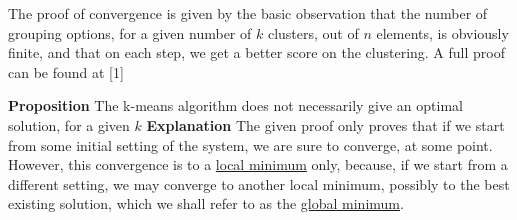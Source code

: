 \documentclass[12pt]{article}
\begin{document}
The proof of convergence is given by the basic observation that the number of grouping options, for a given number of $k$ clusters, out of \(n \) elements, is obviously finite, and that on each step, we get a better score on the clustering.
A full proof can be found at [1] \newline

\textbf{Proposition} The k-means algorithm does not necessarily give an optimal solution, for a given $k$\newline
\textbf{Explanation} The given proof only proves that if we start from some initial setting of the system, we are sure to converge, at some point. However, this convergence is to a \underline{local minimum} only, because, if we start from a different setting, we may converge to another local minimum, possibly to the best existing solution, which we shall refer to as the \underline{global minimum}. \newline
\end{document}
